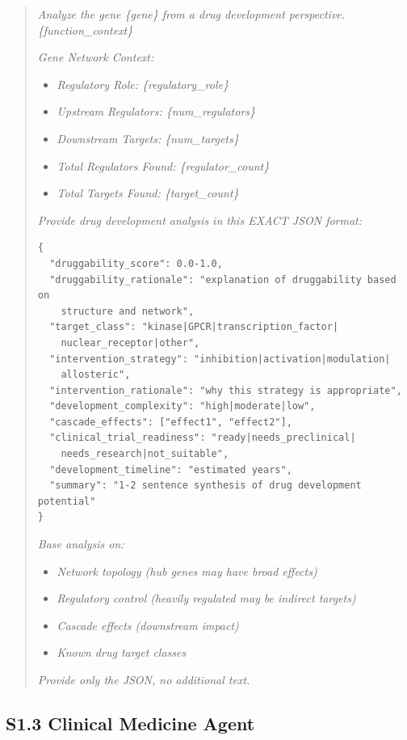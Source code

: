 \documentclass[11pt]{article}
\begin{document}
\begin{quote}
\textit{Analyze the gene \{gene\} from a drug development perspective. \{function\_context\}}

\textit{Gene Network Context:}
\begin{itemize}
\item \textit{Regulatory Role: \{regulatory\_role\}}
\item \textit{Upstream Regulators: \{num\_regulators\}}
\item \textit{Downstream Targets: \{num\_targets\}}
\item \textit{Total Regulators Found: \{regulator\_count\}}
\item \textit{Total Targets Found: \{target\_count\}}
\end{itemize}

\textit{Provide drug development analysis in this EXACT JSON format:}

\begin{verbatim}
{
  "druggability_score": 0.0-1.0,
  "druggability_rationale": "explanation of druggability based on
    structure and network",
  "target_class": "kinase|GPCR|transcription_factor|
    nuclear_receptor|other",
  "intervention_strategy": "inhibition|activation|modulation|
    allosteric",
  "intervention_rationale": "why this strategy is appropriate",
  "development_complexity": "high|moderate|low",
  "cascade_effects": ["effect1", "effect2"],
  "clinical_trial_readiness": "ready|needs_preclinical|
    needs_research|not_suitable",
  "development_timeline": "estimated years",
  "summary": "1-2 sentence synthesis of drug development potential"
}
\end{verbatim}

\textit{Base analysis on:}
\begin{itemize}
\item \textit{Network topology (hub genes may have broad effects)}
\item \textit{Regulatory control (heavily regulated may be indirect targets)}
\item \textit{Cascade effects (downstream impact)}
\item \textit{Known drug target classes}
\end{itemize}

\textit{Provide only the JSON, no additional text.}
\end{quote}

\subsection{S1.3 Clinical Medicine Agent}
\end{document}
